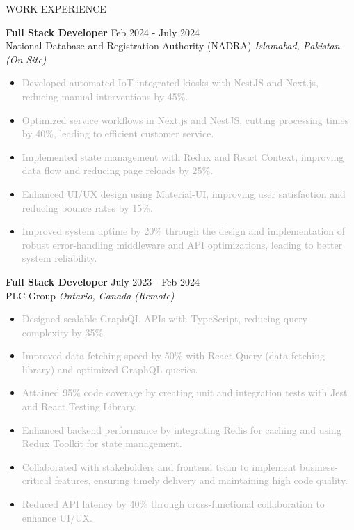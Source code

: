 \documentclass{resume} %
\begin{document}
\begin{rSection}{WORK EXPERIENCE}

\small \textbf{Full Stack Developer} \hfill Feb 2024 - July 2024\\
National Database and Registration Authority (NADRA) \hfill \textit{Islamabad, Pakistan (On Site)}
 \begin{itemize}
    \itemsep -3pt {} 
    \item \textcolor{darkgray}{Developed automated IoT-integrated kiosks with NestJS and Next.js, reducing manual interventions by 45\%.}
  
    \item \textcolor{darkgray}{Optimized service workflows in Next.js and NestJS, cutting processing times by 40\%, leading to efficient customer service.}
   
   
     \item \textcolor{darkgray}{Implemented state management with Redux and React Context, improving data flow and reducing page reloads by 25\%.
}
 \item \textcolor{darkgray}{Enhanced UI/UX design using Material-UI, improving user satisfaction and reducing bounce rates by 15\%.}
  \item \textcolor{darkgray}{Improved system uptime by 20\% through the design and implementation of robust error-handling middleware and API optimizations, leading to better system reliability.}
 \end{itemize}
 
\small \textbf{Full Stack Developer} \hfill July 2023 - Feb 2024\\
PLC Group \hfill \textit{Ontario, Canada (Remote)}
 \begin{itemize}
    \itemsep -3pt {} 
    \item \textcolor{darkgray}{Designed scalable GraphQL APIs with TypeScript, reducing query complexity by 35\%.}
    \item \textcolor{darkgray}{Improved data fetching speed by 50\% with React Query (data-fetching library) and optimized GraphQL queries.}
    \item \textcolor{darkgray}{Attained 95\% code coverage by creating unit and integration tests with Jest and React Testing Library.}
    \item \textcolor{darkgray}{Enhanced backend performance by integrating Redis for caching and using Redux Toolkit for state management.}
     \item \textcolor{darkgray}{Collaborated with stakeholders and frontend team to implement business-critical features, ensuring timely delivery and 
maintaining high code quality.
}
    \item \textcolor{darkgray}{Reduced API latency by 40\% through cross-functional collaboration to enhance UI/UX.}
 \end{itemize}


\end{rSection}
\end{document}
